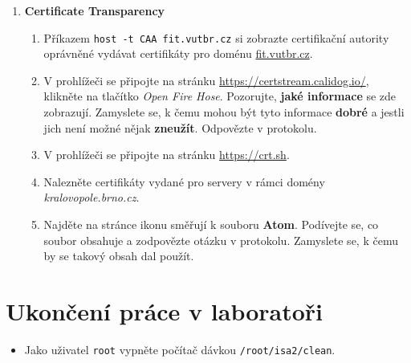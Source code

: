 \documentclass[a4paper,11pt]{article}
\begin{document}
\begin{enumerate}
\begin{enumerate}

    \end{enumerate}

  \item {\bf Certificate Transparency}

    \begin{enumerate}

      \item Příkazem \verb|host -t CAA fit.vutbr.cz| si zobrazte certifikační
        autority oprávněné vydávat certifikáty pro doménu \url{fit.vutbr.cz}.

      \item V prohlížeči se připojte na stránku
        \url{https://certstream.calidog.io/}, klikněte na tlačítko \emph{Open
        Fire Hose}. Pozorujte, \textbf{jaké informace} se zde zobrazují.
        Zamyslete se, k čemu mohou být tyto informace \textbf{dobré} a jestli jich není
        možné nějak \textbf{zneužít}. Odpovězte v protokolu.

      \item V prohlížeči se připojte na stránku \url{https://crt.sh}.

      \item Nalezněte certifikáty vydané pro servery v rámci domény
        \emph{kralovopole.brno.cz}.

      \item Najděte na stránce ikonu směřují k souboru \textbf{Atom}.
      Podívejte se, co soubor obsahuje a zodpovězte otázku v protokolu.
      Zamyslete se, k čemu by se takový obsah dal použít.
    \end{enumerate}

\end{enumerate}


\section{Ukončení práce v laboratoři}
\begin{itemize}
  \item Jako uživatel \texttt{root} vypněte počítač dávkou {\tt /root/isa2/clean}.
\end{itemize}
\end{document}
